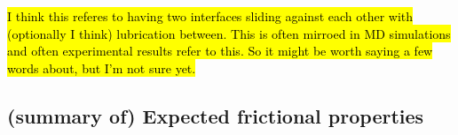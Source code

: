 \hl{I think this referes to having two interfaces sliding against each other with (optionally I think) lubrication between. This is often mirroed in MD simulations and often experimental results refer to this. So it might be worth saying a few words about, but I'm not sure yet.}


















\subsection{(summary of) Expected frictional properties}\label{sec:expected_prop}




